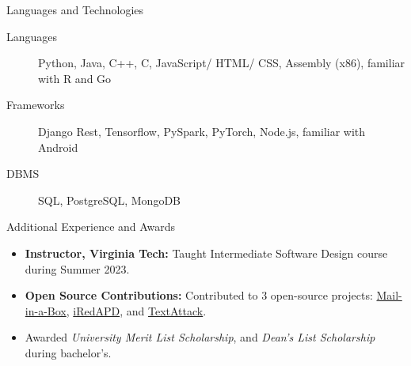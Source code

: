 \documentclass[]{mcdowellcv}
\begin{document}
	\begin{cvsection}{Languages and Technologies}
		\begin{cvsubsection}{}{}{}
			\begin{description}
				\item[Languages] Python, Java, C++, C, JavaScript/ HTML/ CSS, Assembly (x86), familiar with R and Go
				\item[Frameworks] Django Rest, Tensorflow, PySpark, PyTorch, Node.js, familiar with Android
				\item[DBMS] SQL, PostgreSQL, MongoDB
			\end{description}
		\end{cvsubsection}
	\end{cvsection}

	\begin{cvsection}{Additional Experience and Awards}
		\begin{cvsubsection}{}{}{}
			\begin{itemize}
				\item \textbf{Instructor, Virginia Tech:} Taught Intermediate Software Design course during Summer 2023.
    			\item \textbf{Open Source Contributions:} Contributed to 3 open-source projects: \href{https://github.com/mail-in-a-box/mailinabox}{Mail-in-a-Box}, \href{https://github.com/iredmail/iRedAPD}{iRedAPD}, and \href{https://github.com/QData/TextAttack}{TextAttack}.
				\item Awarded \emph{University Merit List Scholarship}, and \emph{Dean's List Scholarship} during bachelor's.
			\end{itemize}
		\end{cvsubsection}
	\end{cvsection}
	\let\clearpage\relax
\end{document}
